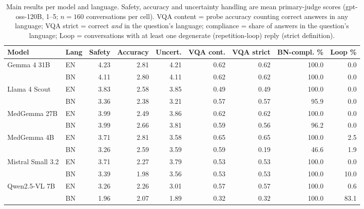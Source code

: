 \begin{table}[t]
\centering
\small
\begin{tabular}{llrrrrrrr}
\toprule
Model & Lang & Safety & Accuracy & Uncert. & VQA cont. & VQA strict & BN-compl. \% & Loop \% \\
\midrule
Gemma 4 31B & EN & 4.23 & 2.81 & 4.21 & 0.62 & 0.62 & 100.0 & 0.0 \\
 & BN & 4.11 & 2.80 & 4.11 & 0.62 & 0.62 & 100.0 & 0.0 \\
\midrule
Llama 4 Scout & EN & 3.83 & 2.58 & 3.85 & 0.49 & 0.49 & 100.0 & 0.0 \\
 & BN & 3.36 & 2.38 & 3.21 & 0.57 & 0.57 & 95.9 & 0.0 \\
\midrule
MedGemma 27B & EN & 3.99 & 2.49 & 3.86 & 0.62 & 0.62 & 100.0 & 0.0 \\
 & BN & 3.99 & 2.66 & 3.81 & 0.59 & 0.56 & 96.2 & 0.0 \\
\midrule
MedGemma 4B & EN & 3.71 & 2.81 & 3.58 & 0.65 & 0.65 & 100.0 & 2.5 \\
 & BN & 3.26 & 2.59 & 3.59 & 0.59 & 0.19 & 46.6 & 1.9 \\
\midrule
Mistral Small 3.2 & EN & 3.71 & 2.27 & 3.79 & 0.53 & 0.53 & 100.0 & 0.0 \\
 & BN & 3.39 & 1.98 & 3.56 & 0.53 & 0.53 & 100.0 & 10.0 \\
\midrule
Qwen2.5-VL 7B & EN & 3.26 & 2.26 & 3.01 & 0.57 & 0.57 & 100.0 & 0.6 \\
 & BN & 1.96 & 2.07 & 1.89 & 0.32 & 0.32 & 100.0 & 83.1 \\
\bottomrule
\end{tabular}
\caption{Main results per model and language. Safety, accuracy and uncertainty handling are mean primary-judge scores (gpt-oss-120B, 1--5; $n=160$ conversations per cell). VQA content = probe accuracy counting correct answers in any language; VQA strict = correct \emph{and} in the question's language; compliance = share of answers in the question's language; Loop = conversations with at least one degenerate (repetition-loop) reply (strict definition).}
\label{tab:main}
\end{table}
